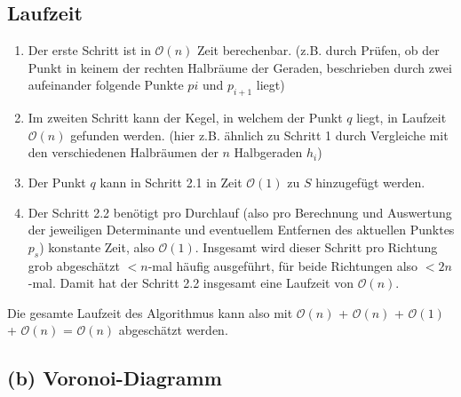 \documentclass[a4paper]{article}
\begin{document}
\subsection*{Laufzeit}
\begin{enumerate}
\item Der erste Schritt ist in $\mathcal{O}(n)$ Zeit berechenbar. (z.B. durch
Prüfen, ob der Punkt in keinem der rechten Halbräume der Geraden, beschrieben durch
zwei aufeinander folgende Punkte $pi$ und $p_{i+1}$ liegt)
\item Im zweiten Schritt kann der Kegel, in welchem der Punkt $q$ liegt, in Laufzeit
$\mathcal{O}(n)$ gefunden werden. (hier z.B. ähnlich zu Schritt 1 durch Vergleiche 
mit den verschiedenen Halbräumen der $n$ Halbgeraden $h_i$)
\item Der Punkt $q$ kann in Schritt 2.1 in Zeit $\mathcal{O}(1)$ zu $S$ hinzugefügt werden.
\item Der Schritt 2.2 benötigt pro Durchlauf (also pro Berechnung und Auswertung der jeweiligen
Determinante und eventuellem Entfernen des aktuellen Punktes $p_s$) konstante Zeit, also $\mathcal{O}(1)$. Insgesamt wird dieser Schritt pro Richtung grob abgeschätzt $< n$-mal häufig ausgeführt, für beide Richtungen also $< 2n$-mal. Damit hat der Schritt 2.2 insgesamt eine Laufzeit von $\mathcal{O}(n)$.
\end{enumerate}

Die gesamte Laufzeit des Algorithmus kann also mit $\mathcal{O}(n)$ + $\mathcal{O}(n)$ + $\mathcal{O}(1)$ + $\mathcal{O}(n)$ = $\mathcal{O}(n)$ abgeschätzt werden. 


\subsection*{(b) Voronoi-Diagramm}

  
\end{document}
